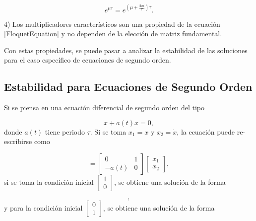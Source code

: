 \documentclass[10pt,a4paper]{report}
\begin{document}
\begin{equation}
e^{\mu \tau} = e^{(\mu  +\frac{2\pi i}{\tau} )\tau}.
\end{equation}

4) Los multiplicadores característicos son una propiedad de la ecuación \eqref{FloquetEquation} y no dependen de la elección de matriz fundamental.

Con estas propiedades, se puede pasar a analizar la estabilidad de las soluciones para el caso específico de ecuaciones de segundo orden.

\subsection{Estabilidad para Ecuaciones de Segundo Orden}\label{EstabilidadSO}

Si se piensa en una ecuación diferencial de segundo orden del tipo

\begin{equation}
\ddot{x} + a(t)x= 0,
\end{equation} donde $a(t)$ tiene periodo $\tau$. Si se toma $x_1 = x$ y $x_2 = \dot{x}$, la ecuación puede re-escribirse como

\begin{equation}
[\begin{array}{c}
\dot{x}_1 \\
\dot{x}_2
\end{array}] = [\begin{array}{cc}
0 & 1 \\
-a(t) & 0
\end{array}][\begin{array}{c} 
x_1 \\ 
x_2

\end{array}],
\end{equation} si se toma la condición inicial $[\begin{array}{c} 1 \\ 0 \end{array}]$, se obtiene una solución de la forma

\begin{equation}
[\begin{array}{c}
x_1^1(t) \\
\dot{x}_1^1(t)
\end{array}],
\end{equation} y para la condición inicial $[\begin{array}{c} 0 \\ 1 \end{array}]$, se obtiene una solución de la forma
\end{document}
